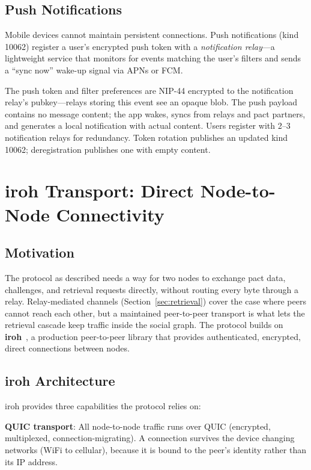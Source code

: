 \documentclass[11pt,a4paper]{article}
\begin{document}
\subsection{Push Notifications}

Mobile devices cannot maintain persistent connections. Push notifications (kind 10062) register a user's encrypted push token with a \emph{notification relay}---a lightweight service that monitors for events matching the user's filters and sends a ``sync now'' wake-up signal via APNs or FCM.

The push token and filter preferences are NIP-44 encrypted to the notification relay's pubkey---relays storing this event see an opaque blob. The push payload contains no message content; the app wakes, syncs from relays and pact partners, and generates a local notification with actual content. Users register with 2--3 notification relays for redundancy. Token rotation publishes an updated kind 10062; deregistration publishes one with empty content.

\section{iroh Transport: Direct Node-to-Node Connectivity}
\label{sec:iroh}

\subsection{Motivation}

The protocol as described needs a way for two nodes to exchange pact data, challenges, and retrieval requests directly, without routing every byte through a relay. Relay-mediated channels (Section~\ref{sec:retrieval}) cover the case where peers cannot reach each other, but a maintained peer-to-peer transport is what lets the retrieval cascade keep traffic inside the social graph. The protocol builds on \textbf{iroh}~\cite{iroh}, a production peer-to-peer library that provides authenticated, encrypted, direct connections between nodes.

\subsection{iroh Architecture}

iroh provides three capabilities the protocol relies on:

\textbf{QUIC transport}: All node-to-node traffic runs over QUIC (encrypted, multiplexed, connection-migrating). A connection survives the device changing networks (WiFi to cellular), because it is bound to the peer's identity rather than its IP address.
\end{document}
